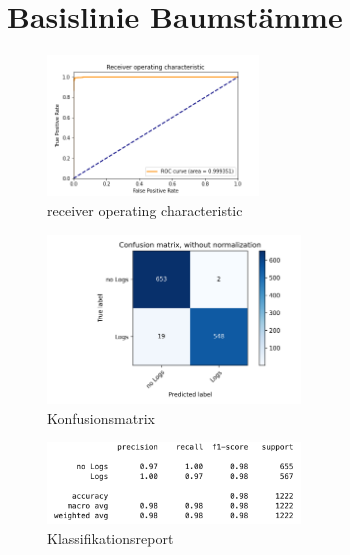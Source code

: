 \chapter{Basislinie Baumstämme}
\label{appendix:BasislinieBaumstämme}

\begin{figure}[h]
	\centering
	\includegraphics[width=0.5\textwidth, center]{bilder/Anhang/Baseline/Logs/Logs_validation/Logs_Baseline_ROC.png}
	\caption[Baumstammklassifikation Basislinie ROC]{receiver operating characteristic}
	\label{img:BaselineLogsROC}
\end{figure}	

\begin{figure}[h]
	\centering
	\includegraphics[width=0.6\textwidth, center]{bilder/Anhang/Baseline/Logs/Logs_validation/Logs_Baseline_Confusion_Matrix.png}
	\caption[Konfusionsmatrix Baumstammklassifikation Basislinie]{Konfusionsmatrix}
	\label{img:BaselineLogsConfusionMatrix}
\end{figure}	

\begin{figure}[h]
	\centering
	\includegraphics[width=0.6\textwidth, center]{bilder/Anhang/Baseline/Logs/Logs_validation/classification_report.png}
	\caption[Klassifikationsreport Baumstammklassifikation Basislinie]{Klassifikationsreport}
	\label{img:BaselineLogsKlassifikationsreport}
\end{figure}	
